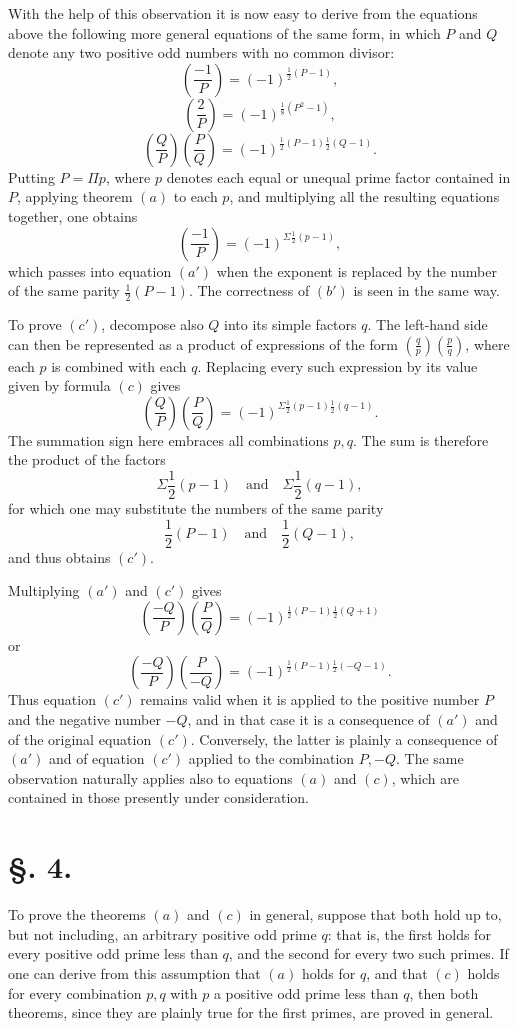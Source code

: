 \documentclass[11pt]{article}
\newcommand{\J}[2]{\left(\frac{#1}{#2}\right)}
\begin{document}
With the help of this observation it is now easy to derive from the equations above the following more general equations of the same form, in which $P$ and $Q$ denote any two positive odd numbers with no common divisor:
\[
\tag{a'} \J{-1}{P}=(-1)^{\frac12(P-1)},
\]
\[
\tag{b'} \J{2}{P}=(-1)^{\frac18(P^2-1)},
\]
\[
\tag{c'} \J{Q}{P}\J{P}{Q}=(-1)^{\frac12(P-1)\frac12(Q-1)}.
\]
Putting $P=\Pi p$, where $p$ denotes each equal or unequal prime factor contained in $P$, applying theorem $(a)$ to each $p$, and multiplying all the resulting equations together, one obtains
\[
 \J{-1}{P}=(-1)^{\Sigma\frac12(p-1)},
\]
which passes into equation $(a')$ when the exponent is replaced by the number of the same parity $\frac12(P-1)$. The correctness of $(b')$ is seen in the same way.

To prove $(c')$, decompose also $Q$ into its simple factors $q$. The left-hand side can then be represented as a product of expressions of the form $\J{q}{p}\J{p}{q}$, where each $p$ is combined with each $q$. Replacing every such expression by its value given by formula $(c)$ gives
\[
 \J{Q}{P}\J{P}{Q}=(-1)^{\Sigma\frac12(p-1)\frac12(q-1)}.
\]
The summation sign here embraces all combinations $p,q$. The sum is therefore the product of the factors
\[
 \Sigma\frac12(p-1)\quad\text{and}\quad \Sigma\frac12(q-1),
\]
for which one may substitute the numbers of the same parity
\[
 \frac12(P-1)\quad\text{and}\quad \frac12(Q-1),
\]
and thus obtains $(c')$.

Multiplying $(a')$ and $(c')$ gives
\[
 \J{-Q}{P}\J{P}{Q}=(-1)^{\frac12(P-1)\frac12(Q+1)}
\]
or
\[
 \J{-Q}{P}\J{P}{-Q}=(-1)^{\frac12(P-1)\frac12(-Q-1)}.
\]
Thus equation $(c')$ remains valid when it is applied to the positive number $P$ and the negative number $-Q$, and in that case it is a consequence of $(a')$ and of the original equation $(c')$. Conversely, the latter is plainly a consequence of $(a')$ and of equation $(c')$ applied to the combination $P,-Q$. The same observation naturally applies also to equations $(a)$ and $(c)$, which are contained in those presently under consideration.

\section*{\S. 4.}

To prove the theorems $(a)$ and $(c)$ in general, suppose that both hold up to, but not including, an arbitrary positive odd prime $q$: that is, the first holds for every positive odd prime less than $q$, and the second for every two such primes. If one can derive from this assumption that $(a)$ holds for $q$, and that $(c)$ holds for every combination $p,q$ with $p$ a positive odd prime less than $q$, then both theorems, since they are plainly true for the first primes, are proved in general.
\end{document}
